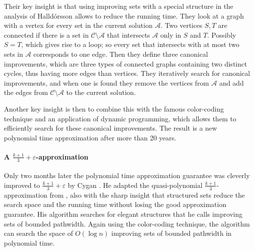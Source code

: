Their key insight is that using improving sets with a special structure in the analysis of Halld\'{o}rsson \cite{Halldorsson} allows to reduce the running time. They look at a graph with a vertex for every set in the current solution $\mathcal{A}$. Two vertices $S,T$ are connected if there is a set in $\mathcal{C} \setminus \mathcal{A}$ that intersects $\mathcal{A}$ only in $S$ and $T$. Possibly $S = T$, which gives rise to a loop; so every set that intersects with at most two sets in $\mathcal{A}$ corresponds to one edge. Then they define three canonical improvements, which are three types of connected graphs containing two distinct cycles, thus having more edges than vertices. They iteratively search for canonical improvements, and when one is found they remove the vertices from $\mathcal{A}$ and add the edges from $\mathcal{C} \setminus \mathcal{A}$ to the current solution.

Another key insight is then to combine this with the famous color-coding technique \cite{ColorCoding} and an application of dynamic programming, which allows them to efficiently search for these canonical improvements. The result is a new polynomial time approximation after more than 20 years.

\paragraph{A $\frac{k+1}{3} + \varepsilon$-approximation} Only two months later the polynomial time approximation guarantee was cleverly improved to $\frac{k+1}{3} + \varepsilon$ by Cygan \cite{Cygan}. He adapted the quasi-polynomial $\frac{k+1}{3}$-approximation from \cite{Mastrolilli}, also with the sharp insight that structured sets reduce the search space and the running time without losing the good approximation guarantee. His algorithm searches for elegant structures that he calls improving sets of bounded pathwidth. Again using the color-coding technique, the algorithm can search the space of $O(\log n)$ improving sets of bounded pathwidth in polynomial time.


